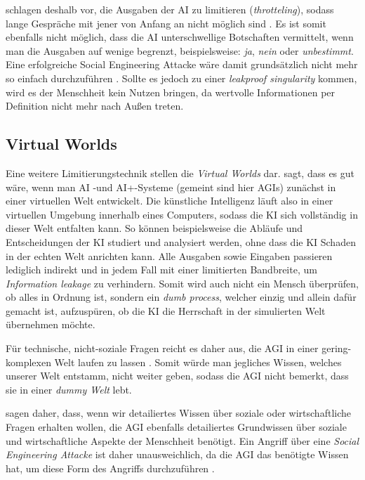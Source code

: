         \citealp{armstrongforthcoming} schlagen deshalb vor, die Ausgaben der AI zu limitieren (\textit{throtteling}), sodass
        lange Gespräche mit jener von Anfang an nicht möglich sind \cite[s. 306]{armstrongforthcoming}. Es ist somit
        ebenfalls nicht möglich, dass die AI unterschwellige Botschaften vermittelt, wenn man die Ausgaben auf wenige
        begrenzt, beispielsweise: \textit{ja}, \textit{nein} oder \textit{unbestimmt}. Eine erfolgreiche Social Engineering
        Attacke wäre damit grundsätzlich nicht mehr so einfach durchzuführen \cite[s. 309]{armstrongforthcoming}.
        Sollte es jedoch zu einer \textit{leakproof singularity} kommen, wird es der Menschheit kein Nutzen bringen, da
        wertvolle Informationen per Definition nicht mehr nach Außen treten.

        \subsection{Virtual Worlds}
        Eine weitere Limitierungstechnik stellen die \textit{Virtual Worlds} dar. \citeauthor{chalmers2010singularity} sagt,
        dass es gut wäre, wenn man AI -und AI+-Systeme (gemeint sind hier AGIs) zunächst in einer virtuellen Welt
        entwickelt. \cite[s. 37]{chalmers2010singularity} Die künstliche Intelligenz läuft also in einer virtuellen Umgebung
        innerhalb eines Computers, sodass die KI sich vollständig in dieser Welt entfalten kann. So können beispielsweise
        die Abläufe und Entscheidungen der KI studiert und analysiert werden, ohne dass die KI Schaden in der echten Welt
        anrichten kann. Alle Ausgaben sowie Eingaben passieren lediglich indirekt und in jedem Fall mit einer limitierten
        Bandbreite, um \textit{Information leakage} zu verhindern. \cite[s. 310]{armstrongforthcoming} Somit wird auch
        nicht ein Mensch überprüfen, ob alles in Ordnung ist, sondern ein \textit{dumb process}, welcher einzig und allein
        dafür gemacht ist, aufzuspüren, ob die KI die Herrschaft in der simulierten Welt übernehmen möchte.

        Für technische, nicht-soziale Fragen reicht es daher aus, die AGI in einer gering-komplexen Welt laufen zu lassen
        \cite[s. 310]{armstrongforthcoming}. Somit würde man jegliches Wissen, welches unserer Welt entstamm, nicht
        weiter geben, sodass die AGI nicht bemerkt, dass sie in einer \textit{dummy Welt} lebt.

        \citealp{armstrongforthcoming} sagen daher, dass, wenn wir detailiertes Wissen über soziale oder wirtschaftliche
        Fragen erhalten wollen, die AGI ebenfalls detailiertes Grundwissen über soziale und wirtschaftliche Aspekte der
        Menschheit benötigt. Ein Angriff über eine \textit{Social Engineering Attacke} ist daher unausweichlich, da die
        AGI das benötigte Wissen hat, um diese Form des Angriffs durchzuführen \cite[s. 310]{armstrongforthcoming}.


